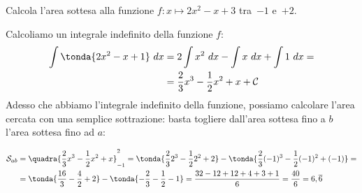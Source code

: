 \begin{esempio}
Calcola l'area sottesa alla funzione \quad
\(f: x \mapsto 2 x^2 -x +3\) \quad 
tra~\(-1\) e~\(+2\).

\begin{minipage}{.59 \textwidth}
Calcoliamo un integrale indefinito della funzione \(f\):
\begin{align*} 
\int \tonda{2 x^2 -x +1}~dx &= 2 \int x^2~dx -\int x~dx + \int 1~dx = \\
                         &= \frac{2}{3}x^3 - \frac{1}{2}x^2 + x + \mathcal{C}
\end{align*}
Adesso che abbiamo l'integrale indefinito della funzione, possiamo calcolare 
l'area cercata con una semplice sottrazione: basta togliere dall'area 
sottesa fino a \(b\) l'area sottesa fino ad \(a\):
\end{minipage}
\hfill
\begin{minipage}{.39 \textwidth}
\begin{inaccessibleblock}[]  
  \begin{center} \intdef \end{center}
\end{inaccessibleblock}
\end{minipage}

\begin{align*}
\mathcal{S}_{ab} &= 
  \quadra{\frac{2}{3}x^3 - \frac{1}{2}x^2 + x}_{-1}^{2} = 
  \tonda{\frac{2}{3}2^3 - \frac{1}{2}2^2 + 2} -
     \tonda{\frac{2}{3}(-1)^3 - \frac{1}{2}(-1)^2 +(-1)} = \\
  &= \tonda{\frac{16}{3} - \frac{4}{2} + 2} - 
     \tonda{-\frac{2}{3} - \frac{1}{2} -1} = 
  \frac{32 -12 +12 +4 +3 +1}{6} = \frac{40}{6} = 6,\overline{6}
\end{align*} 


 
\end{esempio}

